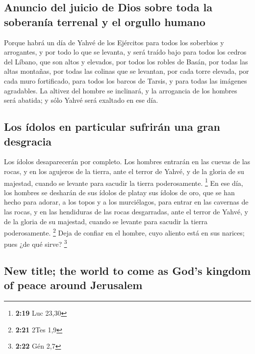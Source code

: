 \begin{paracol}{2}
{\subsection{Anuncio del juicio de Dios sobre toda la soberanía terrenal
y el orgullo
humano}\label{anuncio-del-juicio-de-dios-sobre-toda-la-soberanuxeda-terrenal-y-el-orgullo-humano}}

 Porque habrá un día de Yahvé de los Ejércitos para todos
los soberbios y arrogantes, y por todo lo que se levanta, y será traído
bajo  para todos los cedros del Líbano, que son altos y
elevados, por todos los robles de Basán,  por todas las
altas montañas, por todas las colinas que se levantan, 
por cada torre elevada, por cada muro fortificado,  para
todos los barcos de Tarsis, y para todas las imágenes agradables.
 La altivez del hombre se inclinará, y la arrogancia de
los hombres será abatida; y sólo Yahvé será exaltado en ese día.

\hypertarget{los-uxeddolos-en-particular-sufriruxe1n-una-gran-desgracia}{%
\subsection{Los ídolos en particular sufrirán una gran
desgracia}\label{los-uxeddolos-en-particular-sufriruxe1n-una-gran-desgracia}}

 Los ídolos desaparecerán por completo. 
Los hombres entrarán en las cuevas de las rocas, y en los agujeros de la
tierra, ante el terror de Yahvé, y de la gloria de su majestad, cuando
se levante para sacudir la tierra poderosamente. \footnote{\textbf{2:19}
  Luc 23,30}  En ese día, los hombres se desharán de sus
ídolos de platay sus ídolos de oro, que se han hecho para adorar, a los
topos y a los murciélagos,  para entrar en las cavernas
de las rocas, y en las hendiduras de las rocas desgarradas, ante el
terror de Yahvé, y de la gloria de su majestad, cuando se levante para
sacudir la tierra poderosamente. \footnote{\textbf{2:21} 2Tes 1,9}
 Deja de confiar en el hombre, cuyo aliento está en sus
narices; pues ¿de qué sirve? \footnote{\textbf{2:22} Gén 2,7}

\switchcolumn
\begin{otherlanguage}{english}

\hypertarget{new-title-the-world-to-come-as-gods-kingdom-of-peace-around-jerusalem}{%
\subsection{New title; the world to come as God's kingdom of peace
around
Jerusalem}\label{new-title-the-world-to-come-as-gods-kingdom-of-peace-around-jerusalem}}


\end{otherlanguage}
\end{paracol}
